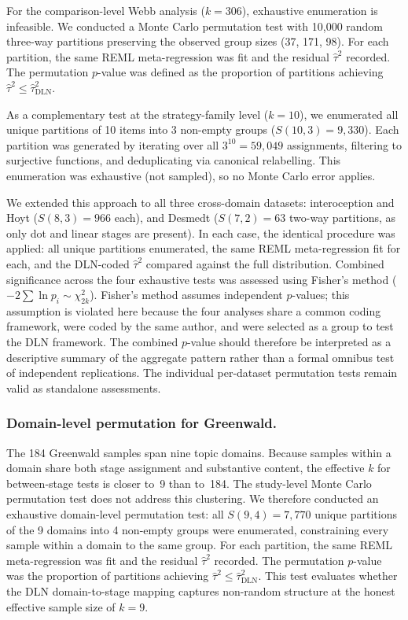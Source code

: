 \documentclass[11pt]{article}
\begin{document}
For the comparison-level Webb analysis ($k = 306$), exhaustive
enumeration is infeasible. We conducted a Monte Carlo permutation test
with 10{,}000 random three-way partitions preserving the observed group
sizes (37, 171, 98). For each partition, the same REML meta-regression
was fit and the residual $\hat\tau^2$ recorded. The permutation
$p$-value was defined as the proportion of partitions achieving
$\hat\tau^2 \leq \hat\tau^2_{\text{DLN}}$.

As a complementary test at the strategy-family level ($k = 10$), we
enumerated all unique partitions of 10 items into 3 non-empty groups
($S(10, 3) = 9{,}330$). Each partition was generated by iterating over
all $3^{10} = 59{,}049$ assignments, filtering to surjective functions,
and deduplicating via canonical relabelling. This enumeration was
exhaustive (not sampled), so no Monte Carlo error applies.

We extended this approach to all three cross-domain datasets:
interoception and Hoyt ($S(8,3) = 966$ each), and
Desmedt ($S(7,2) = 63$ two-way partitions, as only dot and linear stages
are present). In each case, the identical procedure was applied: all
unique partitions enumerated, the same REML meta-regression fit for each,
and the DLN-coded $\hat\tau^2$ compared against the full distribution.
Combined significance across the four exhaustive tests was assessed
using Fisher's method ($-2\sum \ln p_i \sim \chi^2_{2k}$). Fisher's
method assumes independent $p$-values; this assumption is violated here
because the four analyses share a common coding framework, were coded by
the same author, and were selected as a group to test the DLN
framework. The combined $p$-value should therefore be interpreted as a
descriptive summary of the aggregate pattern rather than a formal
omnibus test of independent replications. The individual per-dataset
permutation tests remain valid as standalone assessments.

\subsubsection*{Domain-level permutation for Greenwald.}
The 184 Greenwald samples span nine topic domains. Because samples
within a domain share both stage assignment and substantive content,
the effective $k$ for between-stage tests is closer to~9 than to~184.
The study-level Monte Carlo permutation test does not address this
clustering. We therefore conducted an exhaustive domain-level
permutation test: all $S(9,4) = 7{,}770$ unique partitions of the 9
domains into 4 non-empty groups were enumerated, constraining every
sample within a domain to the same group. For each partition, the
same REML meta-regression was fit and the residual $\hat\tau^2$
recorded. The permutation $p$-value was the proportion of partitions
achieving $\hat\tau^2 \leq \hat\tau^2_{\text{DLN}}$. This test
evaluates whether the DLN domain-to-stage mapping captures non-random
structure at the honest effective sample size of $k = 9$.
\end{document}
